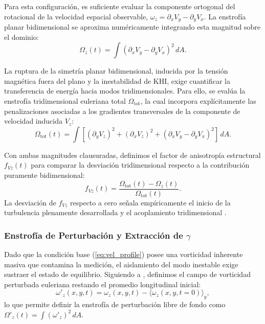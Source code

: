 Para esta configuración, es suficiente evaluar la componente ortogonal del rotacional de la velocidad espacial observable, $\omega_z = \partial_x V_y - \partial_y V_x$. La enstrofía planar bidimensional se aproxima numéricamente integrando esta magnitud sobre el dominio:
\begin{equation}
    \Omega_z(t) = \int (\partial_x V_y - \partial_y V_x)^2 \, dA.
\end{equation}

La ruptura de la simetría planar bidimensional, inducida por la tensión magnética fuera del plano y la inestabilidad de KHI, exige cuantificar la transferencia de energía hacia modos tridimensionales. Para ello, se evalúa la enstrofía tridimensional euleriana total $\Omega_{\text{tot}}$, la cual incorpora explícitamente las penalizaciones asociadas a los gradientes transversales de la componente de velocidad inducida $V_z$:
\begin{equation}
    \Omega_{\text{tot}}(t) = \int \left[ (\partial_y V_z)^2 + (\partial_x V_z)^2 + (\partial_x V_y - \partial_y V_x)^2 \right] \, dA.
\end{equation}

Con ambas magnitudes clausuradas, definimos el factor de anisotropía estructural $f_{Vz}(t)$ para comparar la desviación tridimensional respecto a la contribución puramente bidimensional:
\begin{equation}
    f_{Vz}(t) = \frac{\Omega_{\text{tot}}(t) - \Omega_z(t)}{\Omega_{\text{tot}}(t)}.
    \label{eq:fvz}
\end{equation}
La desviación de $f_{Vz}$ respecto a cero señala empíricamente el inicio de la turbulencia plenamente desarrollada y el acoplamiento tridimensional \parencite{bodo-2004}.

\subsubsection{Enstrofía de Perturbación y Extracción de $\gamma$}

\primerparrafo Dado que la condición base (\ref{eq:vel_profile}) posee una vorticidad inherente masiva que contamina la medición, el aislamiento del modo inestable exige sustraer el estado de equilibrio. Siguiendo a \textcite{nastro2022}, definimos el campo de vorticidad perturbada euleriana restando el promedio longitudinal inicial:
\begin{equation}
    \omega'_z(x, y, t) = \omega_z(x, y, t) - \langle \omega_z(x, y, t=0) \rangle_y,
\end{equation}
lo que permite definir la enstrofía de perturbación libre de fondo como $\Omega'_z(t) = \int (\omega'_z)^2 \, dA$.

